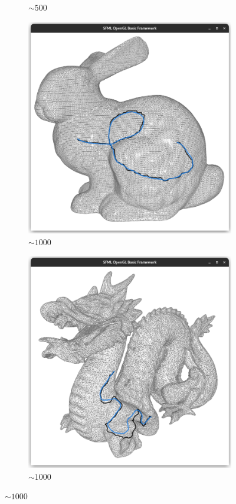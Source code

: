 \documentclass{stdlocal}
\begin{document}
\begin{figure}
\begin{subfigure}[b]{0.24\linewidth}
    \caption{$\sim 500$}
  \end{subfigure}
  \begin{subfigure}[b]{0.24\linewidth}
    \centering
    \includegraphics[width=\linewidth,trim={25px 20 25 50},clip]{images/bunny-smooth-1.png}
    \caption{$\sim 1000$}
  \end{subfigure}
  \begin{subfigure}[b]{0.24\linewidth}
    \centering
    \includegraphics[width=\linewidth,trim={25px 20 25 50},clip]{images/dragon-smooth-1.png}
    \caption{$\sim 1000$}
  \end{subfigure}


\end{figure}
\end{document}
